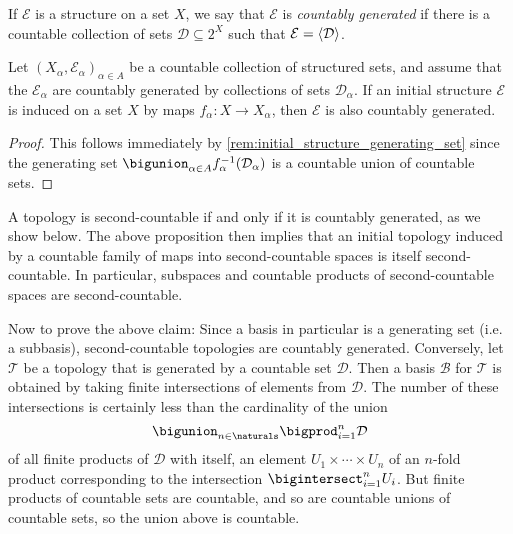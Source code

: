 \documentclass[article, a4paper, 11pt, oneside]{memoir}
\numberwithin{equation}{chapter}
\newcommand{\calT}{\mathcal{T}}
\newcommand{\calB}{\mathcal{B}}
\newcommand{\calE}{\mathcal{E}}
\newcommand{\calD}{\mathcal{D}}
\DeclarePairedDelimiter{\gen}{\langle}{\rangle} %
\newcommand{\preim}{^{-1}}
\begin{document}
If $\calE$ is a structure on a set $X$, we say that $\calE$ is \emph{countably generated} if there is a countable collection of sets $\calD \subseteq 2^X$ such that $\calE = \gen{\calD}$.

\begin{proposition}
    Let $(X_\alpha,\calE_\alpha)_{\alpha \in A}$ be a countable collection of structured sets, and assume that the $\calE_\alpha$ are countably generated by collections of sets $\calD_\alpha$. If an initial structure $\calE$ is induced on a set $X$ by maps $f_\alpha \colon X \to X_\alpha$, then $\calE$ is also countably generated.
\end{proposition}

\begin{proof}
    This follows immediately by \cref{rem:initial_structure_generating_set} since the generating set $\bigunion_{\alpha \in A} f_\alpha\preim(\calD_\alpha)$ is a countable union of countable sets.
\end{proof}


\begin{examplebreak}
    \label{ex:second_countable_space}
    A topology is second-countable if and only if it is countably generated, as we show below. The above proposition then implies that an initial topology induced by a countable family of maps into second-countable spaces is itself second-countable. In particular, subspaces and countable products of second-countable spaces are second-countable.
    
    Now to prove the above claim: Since a basis in particular is a generating set (i.e. a subbasis), second-countable topologies are countably generated. Conversely, let $\calT$ be a topology that is generated by a countable set $\calD$. Then a basis $\calB$ for $\calT$ is obtained by taking finite intersections of elements from $\calD$. The number of these intersections is certainly less than the cardinality of the union
    \begin{equation*}
        \bigunion_{n \in \naturals} \bigprod_{i=1}^n \calD
    \end{equation*}
    of all finite products of $\calD$ with itself, an element $U_1 \times \cdots \times U_n$ of an $n$-fold product corresponding to the intersection $\bigintersect_{i=1}^n U_i$. But finite products of countable sets are countable, and so are countable unions of countable sets, so the union above is countable.
\end{examplebreak}
\end{document}
